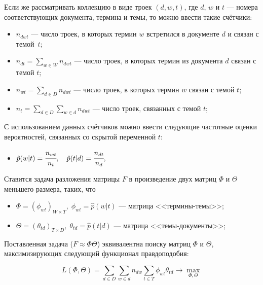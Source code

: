 Если же рассматривать коллекцию в виде троек $(d, w, t)$, где $d$, $w$ и $t$ --- номера соответствующих документа, термина и темы, то можно ввести такие счётчики: 

\begin{itemize}
	\item $n_{dwt}$ --- число троек, в которых термин $w$ встретился в документе $d$ и связан с темой~$t$;
	\item $n_{dt} = \sum_{w \in W} n_{dwt}$ --- число троек, в которых термин из документа $d$ связан с темой $t$;
	\item $n_{wt} = \sum_{d \in D} n_{dwt}$ --- число троек, в которых термин $w$ связан с темой $t$;
	\item $n_t = \sum_{d \in D}\sum_{w \in d} n_{dwt}$ --- число троек, связанных с темой $t$;
\end{itemize}

С использованием данных счётчиков можно ввести следующие частотные оценки вероятностей, связанных со скрытой переменной $t$:

\begin{itemize}\label{label_1}
\item $ 
	\hat p(w|t) = \cfrac{n_{wt}}{n_t}, \quad
	\hat p(t|d) = \cfrac{n_{dt}}{n_d}, $ 
\end{itemize}

Ставится задача разложения матрицы $F$ в произведение двух матриц $\Phi$ и $\Theta$ меньшего размера, таких, что

\begin{itemize}
\item $\Phi = (\phi_{wt})_{W \times T}, \; \phi_{wt} = \hat p(w|t)$ --- матрица <<термины-темы>>;
\item $\Theta = (\theta_{td})_{T \times D}, \; \theta_{td} = \hat p(t|d)$ --- матрица <<темы-документы>>;
\end{itemize}

Поставленная задача ($F \approx \Phi \Theta$) эквивалентна поиску матриц $\Phi$ и $\Theta$, максимизирующих следующий функционал правдоподобия:

\begin{equation}\label{eq_1}
 	L(\Phi, \Theta) = \sum_{d \in D} \sum_{w \in d} n_{dw} \sum_{t \in T} \phi_{wt} \theta_{td} \rightarrow \max_{\Phi, \Theta}
\end{equation}
